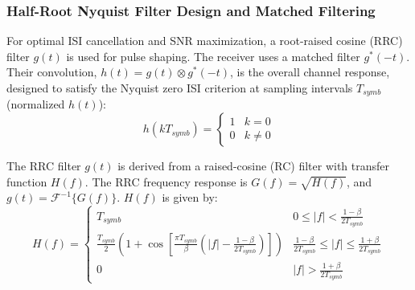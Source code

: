 \documentclass[11pt]{article}
\begin{document}
	\subsubsection{Half-Root Nyquist Filter Design and Matched Filtering}
	For optimal ISI cancellation and SNR maximization, a root-raised cosine (RRC) filter $g(t)$ is used for pulse shaping. The receiver uses a matched filter $g^*(-t)$. Their convolution, $h(t) = g(t) \otimes g^*(-t)$, is the overall channel response, designed to satisfy the Nyquist zero ISI criterion at sampling intervals $T_{symb}$ (normalized $h(t)$):
	\begin{equation}
		h(kT_{symb}) = \begin{cases}
			1 & k=0 \\
			0 & k \neq 0
		\end{cases}
		\label{eq:nyquist_criterion_part1}
	\end{equation}
	\par
	The RRC filter $g(t)$ is derived from a raised-cosine (RC) filter with transfer function $H(f)$. The RRC frequency response is $G(f) = \sqrt{H(f)}$, and $g(t) = \mathcal{F}^{-1}\{G(f)\}$. $H(f)$ is given by:
	\begin{equation}
		H(f) = \begin{cases}
			T_{symb} & 0 \le |f| < \frac{1-\beta}{2T_{symb}} \\ 
			\frac{T_{symb}}{2} \left(1 + \cos\left[\frac{\pi T_{symb}}{\beta}\left(|f| - \frac{1-\beta}{2T_{symb}}\right)\right]\right) & \frac{1-\beta}{2T_{symb}} \le |f| \le \frac{1+\beta}{2T_{symb}} \\ 
			0 & |f| > \frac{1+\beta}{2T_{symb}}
		\end{cases}
		\label{eq:rc_response_part1}
	\end{equation}
	
\end{document}
